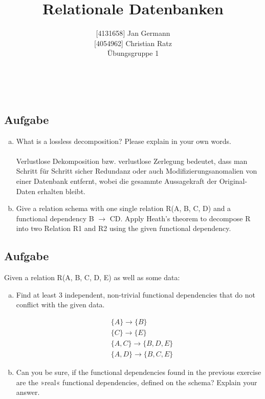 \documentclass[11pt,a4paper,DIV=9]{scrartcl}
\author{{[}4131658{]} Jan Germann \\{[}4054962{]} Christian Ratz\\Übungsgruppe 1}
\title{Relationale Datenbanken}
\newcounter{temp}
\newcommand{\aufgabe}[1]{
  \setcounter{temp}{\value{subsection}}
  \setcounter{subsection}{#1}
  \addtocounter{subsection}{-1}
  \subsection{Aufgabe}
  \setcounter{subsection}{\value{temp}}
}
\renewcommand{\author}[1]{\renewcommand{\author}{#1}}
\renewcommand{\title}[1]{\renewcommand{\title}{#1}}
\newcommand{\makehomeworktitle}{
  \begin{minipage}[t]{6.5cm}
    \sf{\author}
  \end{minipage}
  \begin{minipage}[t]{6.5cm}
    \begin{flushright}
      \sf{\title\\\today}
    \end{flushright}
  \end{minipage}
  \\[0.2cm]
  \begin{center}
    \sf{
      \color{blue}{
        \LARGE{Aufgabenblatt \blattnr}
      }
    }
  \end{center}
  \vspace{0.1cm}
}
\begin{document}
\makehomeworktitle
\aufgabe{1}
  \begin{enumerate}[a.]
    \item What is a lossless decomposition? Please explain in your own words. \\\\
    Verlustlose Dekomposition bzw. verlustlose Zerlegung bedeutet, dass man Schritt f\"ur Schritt sicher Redundanz oder auch Modifizierungsanomalien von einer Datenbank entfernt, wobei die gesammte Aussagekraft der Original-Daten erhalten bleibt.
    \item Give a relation schema with one single relation R(A, B, C, D) and a functional dependency B $  \rightarrow $  CD. Apply Heath's theorem to decompose R into two Relation R1 and R2 using the given functional dependency.
  \end{enumerate}

\aufgabe{2}
  Given a relation R(A, B, C, D, E) as well as some data:
  \begin{enumerate}[a.]
    \item Find at least 3 independent, non-trivial functional dependencies that do not conflict with the given data.

    \begin{align}
      &\{A\}       \rightarrow \{B\}\\
      &\{C\}       \rightarrow \{E\}\\
      &\{A, C\}    \rightarrow \{B,D,E\}\\
      &\{A, D\}    \rightarrow \{B,C,E\}
    \end{align}

   \item Can you be sure, if the functional dependencies found in the previous exercise are the »real« functional dependencies, defined on the schema? Explain your answer.
  \end{enumerate}
\end{document}
